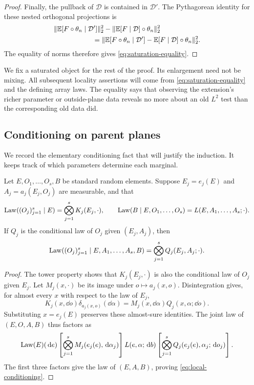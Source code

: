 \begin{proof}
Finally, the pullback of $\mathcal D$ is contained in $\mathcal D'$.
The Pythagorean identity for these nested orthogonal projections is
\begin{align*}
 &\lVert \mathbb E[F\circ\theta_n\mid\mathcal D']\rVert_2^2
 -\lVert \mathbb E[F\mid\mathcal D]\circ\theta_n\rVert_2^2\\
 &\hspace{2cm}=
 \lVert \mathbb E[F\circ\theta_n\mid\mathcal D']
       -\mathbb E[F\mid\mathcal D]\circ\theta_n\rVert_2^2.
\end{align*}
The equality of norms therefore gives \eqref{eq:saturation-equality}.
\end{proof}

We fix a saturated object for the rest of the proof.  Its enlargement
need not be mixing.  All subsequent locality assertions will come from
\eqref{eq:saturation-equality} and the defining array laws. The equality
says that observing the extension's richer parameter or outside-plane
data reveals no more about an old $L^2$ test than the corresponding old
data did.

\subsection{Conditioning on parent planes}

We record the elementary conditioning fact that will justify the
induction.  It keeps track of which parameters determine each marginal.

\begin{lemma}\label{lem:local-conditioning}
Let $E,O_1,\ldots,O_s,B$ be standard random elements.  Suppose
$E_j=e_j(E)$ and $A_j=a_j(E_j,O_j)$ are measurable, and that
\[
 \operatorname{Law}((O_j)_{j=1}^s\mid E)
   =\bigotimes_{j=1}^s K_j(E_j,\cdot),\qquad
 \operatorname{Law}(B\mid E,O_1,\ldots,O_s)=L(E,A_1,\ldots,A_s;\cdot).
\]
If $Q_j$ is the conditional law of $O_j$ given $(E_j,A_j)$, then
\begin{equation}\label{eq:local-conditioning}
 \operatorname{Law}((O_j)_{j=1}^s\mid E,A_1,\ldots,A_s,B)
 =\bigotimes_{j=1}^s Q_j(E_j,A_j;\cdot).
\end{equation}
\end{lemma}

\begin{proof}
The tower property shows that $K_j(E_j,\cdot)$ is also the conditional
law of $O_j$ given $E_j$.  Let $M_j(x,\cdot)$ be its image under
$o\mapsto a_j(x,o)$.  Disintegration gives, for almost every $x$ with
respect to the law of $E_j$,
\[
 K_j(x,\dd o)\delta_{a_j(x,o)}(\dd\alpha)
 =M_j(x,\dd\alpha)Q_j(x,\alpha;\dd o).
\]
Substituting $x=e_j(E)$ preserves these almost-sure identities.  The
joint law of $(E,O,A,B)$ thus factors as
\[
 \operatorname{Law}(E)(\,\mathrm d e)
 \left[\bigotimes_{j=1}^sM_j(e_j(e),\,\mathrm d\alpha_j)\right]
 L(e,\alpha;\,\mathrm d b)
 \left[\bigotimes_{j=1}^sQ_j(e_j(e),\alpha_j;\,\mathrm d o_j)\right].
\]
The first three factors give the law of $(E,A,B)$, proving
\eqref{eq:local-conditioning}.
\end{proof}

